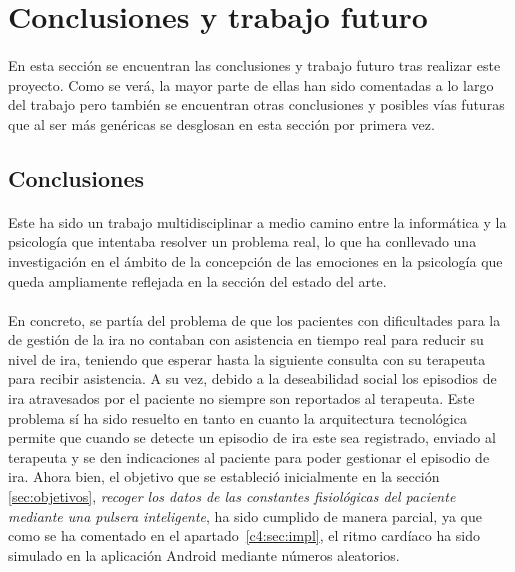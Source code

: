 %
%

\section{Conclusiones y trabajo futuro}
\paragraph{}
En esta sección se encuentran las conclusiones y trabajo futuro tras realizar este proyecto. Como se verá, la mayor parte de ellas han sido comentadas a lo largo del trabajo pero también se encuentran otras conclusiones y posibles vías futuras que al ser más genéricas se desglosan en esta sección por primera vez.

\subsection{Conclusiones}
\paragraph{}
Este ha sido un trabajo multidisciplinar a medio camino entre la informática y la psicología que intentaba resolver un problema real, lo que ha conllevado una investigación en el ámbito de la concepción de las emociones en la psicología que queda ampliamente reflejada en la sección del estado del arte.

\paragraph{}
En concreto, se partía del problema de que los pacientes con dificultades para la de gestión de la ira no contaban con asistencia en tiempo real para reducir su nivel de ira, teniendo que esperar hasta la siguiente consulta con su terapeuta para recibir asistencia. A su vez, debido a la deseabilidad social los episodios de ira atravesados por el paciente no siempre son reportados al terapeuta. Este problema sí ha sido resuelto en tanto en cuanto la arquitectura tecnológica permite que cuando se detecte un episodio de ira este sea registrado, enviado al terapeuta y se den indicaciones al paciente para poder gestionar el episodio de ira. Ahora bien, el objetivo que se estableció inicialmente en la sección \ref{sec:objetivos}, \textit{recoger los datos de las constantes fisiológicas del paciente mediante una pulsera inteligente}, ha sido cumplido de manera parcial, ya que como se ha comentado en el apartado~\ref{c4:sec:impl}, el ritmo cardíaco ha sido simulado en la aplicación Android mediante números aleatorios.

